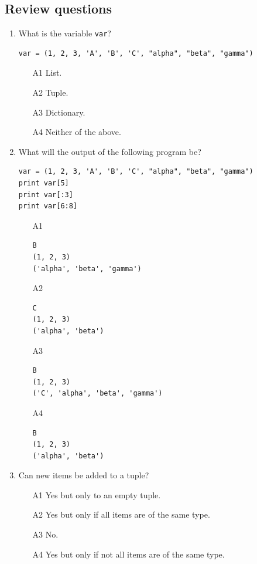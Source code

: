 \subsection{Review questions}

\begin{enumerate}
\item What is the variable {\tt var}?
\begin{verbatim}
var = (1, 2, 3, 'A', 'B', 'C', "alpha", "beta", "gamma")
\end{verbatim}
\begin{enumerate}
\item[A1] List.
\item[A2] Tuple.
\item[A3] Dictionary.
\item[A4] Neither of the above.
\end{enumerate}
\item What will the output of the following program be?
\begin{verbatim}
var = (1, 2, 3, 'A', 'B', 'C', "alpha", "beta", "gamma")
print var[5]
print var[:3]
print var[6:8]
\end{verbatim}
\begin{enumerate}
\item[A1] 
\begin{verbatim}
B
(1, 2, 3)
('alpha', 'beta', 'gamma')
\end{verbatim}
\item[A2] 
\begin{verbatim}
C
(1, 2, 3)
('alpha', 'beta')
\end{verbatim}
\item[A3] 
\begin{verbatim}
B
(1, 2, 3)
('C', 'alpha', 'beta', 'gamma')
\end{verbatim}
\item[A4]
\begin{verbatim}
B
(1, 2, 3)
('alpha', 'beta')
\end{verbatim}
\end{enumerate}
\item Can new items be added to a tuple?
\begin{enumerate}
\item[A1] Yes but only to an empty tuple.
\item[A2] Yes but only if all items are of the same type.
\item[A3] No.
\item[A4] Yes but only if not all items are of the same type.
\end{enumerate}

\end{enumerate}
